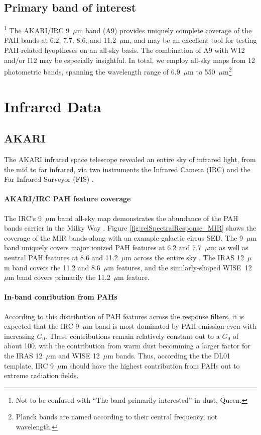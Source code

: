   \subsection{Primary band of interest}\footnote{Not to be confused with ``The band primarily interested'' in dust, Queen.}
    The AKARI/IRC 9~$\mu$m band (A9) provides uniquely complete coverage of the PAH bands at 6.2, 7.7, 8.6, and 11.2~$\mu$m, and may be an excellent tool for testing PAH-related hyoptheses on an all-sky basis. The combination of A9 with W12 and/or I12 may be especially insightful. In total, we employ all-sky maps from 12 photometric bands, spanning the wavelength range of 6.9~$\mu$m to 550~$\mu$m\footnote{Planck bands are named according to their central frequency, not wavelength.}

  \section{Infrared Data}
    \subsection{AKARI}
       The AKARI infrared space telescope revealed an entire sky of infrared light, from the mid to far infrared, via two instruments \citep{akari07} the Infrared Camera (IRC)\citep{irc07} and the Far Infrared Surveyor (FIS) \citep{fis07}.

       \paragraph{AKARI/IRC PAH feature coverage}
         The IRC's 9~$\mu$m band all-sky map demonstrates the abundance of the PAH bands carrier in the Milky Way \citep{ishihara10}. Figure \ref{fig:relSpectralResponse_MIR} shows the coverage of the MIR bands along with an example galactic cirrus SED. The 9~$\mu$m band uniquely covers major ionized PAH features at 6.2 and 7.7~$\mu$m; as well as neutral PAH features at 8.6 and 11.2~$\mu$m across the entire sky \citep{irc07}. The IRAS 12~$\mu$m band covers the 11.2 and 8.6~$\mu$m features, and the similarly-shaped WISE~12~$\mu$m band covers primarily the 11.2~$\mu$m feature.

         \paragraph{In-band conribution from PAHs}
           According to this distribution of PAH features across the response filters, it is expected that the IRC 9~$\mu{}$m band is most dominated by PAH emission even with increasing $G_0$. These contributions remain relatively constant out to a $G_{0}$ of about 100, with the contribution from warm dust becomming a larger factor for the IRAS 12~$\mu$m and WISE 12~$\mu$m bands. Thus, according the the DL01 template, IRC 9~$\mu$m should have the highest contribution from PAHs out to extreme radiation fields.

